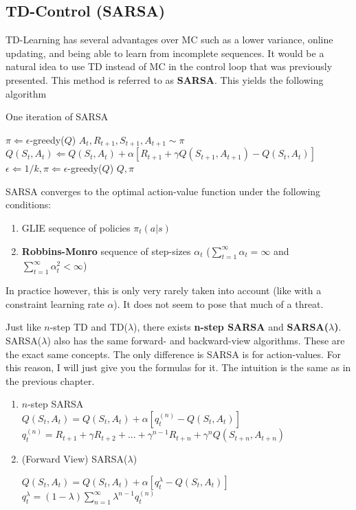 \subsection{TD-Control (SARSA)}

TD-Learning has several advantages over MC such as a lower variance, online updating, and being able to learn from incomplete sequences. It would be a natural idea to use TD instead of MC in the control loop that was previously presented. This method is referred to as \textbf{SARSA}. This yields the following algorithm

\begin{algorithm}[H]
	\caption{One iteration of SARSA}
	\label{alg:SARSA}
	\begin{algorithmic}
		\REQUIRE $\pi \Leftarrow \epsilon$-greedy($Q$)
		\STATE $A_t, R_{t+1}, S_{t+1}, A_{t+1} \sim \pi$
		\STATE $Q(S_t, A_t) \Leftarrow Q(S_t, A_t) + \alpha \left[R_{t+1} + \gamma Q(S_{t+1}, A_{t+1}) - Q(S_t, A_t) \right]$
		\ENDFOR
		\STATE $\epsilon \Leftarrow 1/k, \pi \Leftarrow \epsilon$-greedy($Q$)
		\RETURN $Q, \pi$
	\end{algorithmic}
\end{algorithm}

SARSA converges to the optimal action-value function under the following conditions:
\begin{enumerate}
	\item GLIE sequence of policies $\pi_t(a|s)$
	\item \textbf{Robbins-Monro} sequence of step-sizes $\alpha_t$ ($\sum_{t = 1}^\infty \alpha_t = \infty$ and $\sum_{t = 1}^\infty \alpha_t^2 < \infty$)
\end{enumerate}
In practice however, this is only very rarely taken into account (like with a constraint learning rate $\alpha$). It does not seem to pose that much of a threat. 

Just like $n$-step TD and TD($\lambda$), there exists \textbf{n-step SARSA} and \textbf{SARSA($\lambda$)}. SARSA($\lambda$) also has the same forward- and backward-view algorithms. These are the exact same concepts. The only difference is SARSA is for action-values. For this reason, I will just give you the formulas for it. The intuition is the same as in the previous chapter.
\begin{enumerate}
	\item $n$-step SARSA\\
	
	$Q(S_t, A_t) = Q(S_t, A_t) + \alpha \left[q_t^{(n)} - Q(S_t, A_t) \right]$\\
	$q_t^{(n)} = R_{t+1} + \gamma R_{t+2} + ... + \gamma^{n-1} R_{t+n} + \gamma^n Q(S_{t+n}, A_{t+n})$
	
	\item (Forward View) SARSA($\lambda$)
	
	$Q(S_t, A_t) = Q(S_t, A_t) + \alpha \left[q_t^\lambda - Q(S_t, A_t) \right]$\\
	$q_t^\lambda = (1-\lambda) \sum_{n = 1}^\infty \lambda^{n-1} q_t^{(n)}$	
\end{enumerate}

